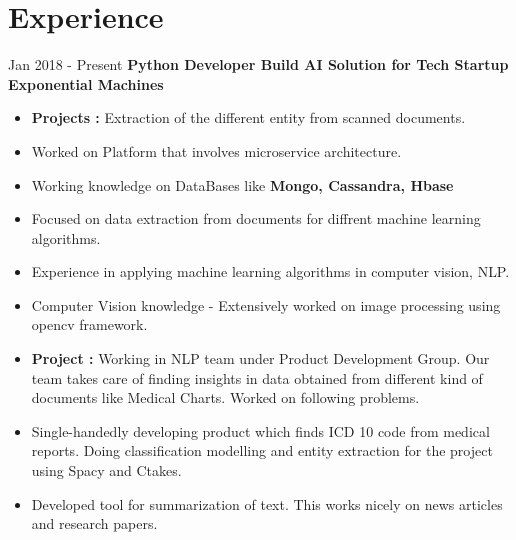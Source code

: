 \documentclass[letterpaper]{twentysecondcv} %
\begin{document}
\makeprofile %
 

\section{Experience}

\begin{twenty} %
\twentyitem
    	{Jan 2018 -}
		{Present}
		{\textbf{Python Developer Build AI Solution for Tech Startup Exponential Machines}}
        {\href{http://www.xpms.io/}{}}
        {}
        {\begin{itemize}
		\item \textbf{Projects :} Extraction of the different entity from scanned documents.
	\item Worked on Platform that involves microservice architecture.
	\item Working knowledge on DataBases like \textbf{Mongo, Cassandra, Hbase}
        \item Focused on data extraction from documents for diffrent machine learning algorithms.
		\item  Experience in applying machine learning algorithms in computer vision, NLP.
		\item Computer Vision knowledge - Extensively worked on image processing using opencv framework.
		\item \textbf{Project :} Working in NLP team under Product Development Group. Our team takes care of finding insights in data obtained from
		different kind of documents like Medical Charts. Worked on following problems.
		\item Single-handedly developing product which finds ICD 10 code from medical reports. Doing classification modelling and
		entity extraction for the project using Spacy and Ctakes. 
		\item Developed tool for summarization of text. This works nicely on news articles and research papers.
        


\end{itemize}}
\end{twenty}
\end{document}
